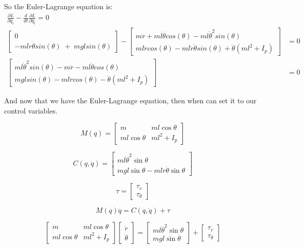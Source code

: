 So the Euler-Lagrange equation is:
\begin{align}
	\frac{\partial L}{\partial q_i} - \frac{d}{dt} \frac{\partial L}{\partial \dot q_i} = 0 \\
	\begin{bmatrix}0 \\ -ml\dot{r}\dot{\theta}sin(\theta) \; + \; mglsin(\theta)\end{bmatrix} - \begin{bmatrix} m\ddot{r} + ml\ddot{\theta}cos(\theta) - ml\dot{\theta}^2sin(\theta) \\
		ml\ddot{r}cos(\theta) - ml\dot{r}\dot{\theta}sin(\theta) + \ddot{\theta}(ml^2 + I_p) \end{bmatrix} &= 0 \\
    \begin{bmatrix}ml\dot{\theta}^2sin(\theta) - m\ddot{r} - ml\ddot{\theta}cos(\theta) \\
		mglsin(\theta) - ml\ddot{r}cos(\theta) - \ddot{\theta}(ml^2 + I_p) \end{bmatrix} &= 0
\end{align}

And now that we have the Euler-Lagrange equation, then when can set it to our control variables.

\[
M(q) =
\begin{bmatrix}
	m & m l \cos\theta \\
	m l \cos\theta & m l^2 + I_p
\end{bmatrix}
\]

\[
C(q, \dot{q}) =
\begin{bmatrix}
	m l \dot{\theta}^2 \sin\theta \\
	m g l \sin\theta - m l \dot{r} \dot{\theta} \sin\theta
\end{bmatrix}
\]

\[
\tau =
\begin{bmatrix}
	\tau_r \\
	\tau_\theta
\end{bmatrix}
\]

\[
M(q) \ddot{q} = C(q, \dot{q}) + \tau
\]

\[
\begin{bmatrix}
	m & m l \cos\theta \\
	m l \cos\theta & m l^2 + I_p
\end{bmatrix}
\begin{bmatrix}
	\ddot{r} \\
	\ddot{\theta}
\end{bmatrix}
=
\begin{bmatrix}
	m l \dot{\theta}^2 \sin\theta \\
	m g l \sin\theta
\end{bmatrix}
+
\begin{bmatrix}
	\tau_r \\
	\tau_\theta
\end{bmatrix}
\]


